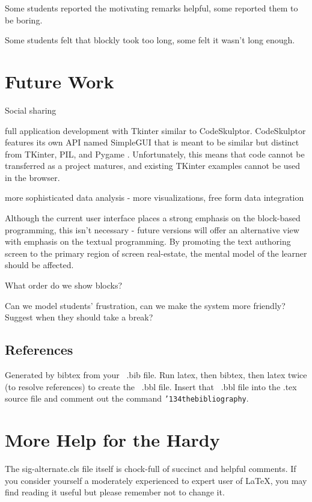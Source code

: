 \documentclass{sig-alternate}
\begin{document}
Some students reported the motivating remarks helpful, some reported them to be boring.

Some students felt that blockly took too long, some felt it wasn't long enough.

\section{Future Work}

Social sharing

full application development with Tkinter similar to CodeSkulptor. CodeSkulptor features its own API named SimpleGUI that is meant to be similar but distinct from TKinter, PIL, and Pygame \cite{Tang}. Unfortunately, this means that code cannot be transferred as a project matures, and existing TKinter examples cannot be used in the browser.

more sophisticated data analysis - more visualizations, free form data integration

Although the current user interface places a strong emphasis on the block-based programming, this isn't necessary - future versions will offer an alternative view with emphasis on the textual programming. By promoting the text authoring screen to the primary region of screen real-estate, the mental model of the learner should be affected.

What order do we show blocks?

Can we model students' frustration, can we make the system more friendly? Suggest when they should take a break?


%

%
%
\appendix
\subsection{References}
Generated by bibtex from your ~.bib file.  Run latex,
then bibtex, then latex twice (to resolve references)
to create the ~.bbl file.  Insert that ~.bbl file into
the .tex source file and comment out
the command \texttt{{\char'134}thebibliography}.
\section{More Help for the Hardy}
The sig-alternate.cls file itself is chock-full of succinct
and helpful comments.  If you consider yourself a moderately
experienced to expert user of \LaTeX, you may find reading
it useful but please remember not to change it.
\end{document}
